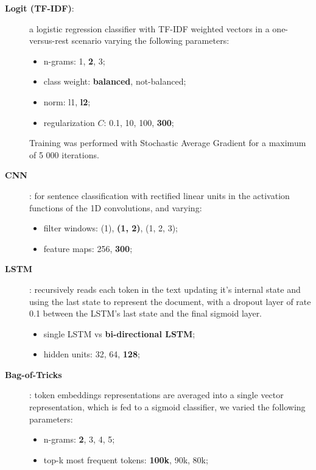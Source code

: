 \documentclass[11pt,a4paper]{article}
\begin{document}
\begin{description}

\item[\textbf{Logit (TF-IDF)}:] a logistic regression classifier with TF-IDF
weighted vectors in a one-versus-rest scenario varying the following parameters:

\begin{itemize}
\item n-grams: 1, \textbf{2}, 3;
\item class weight: \textbf{balanced}, not-balanced;
\item norm: l1, \textbf{l2};
\item regularization $C$: 0.1, 10, 100, \textbf{300};
\end{itemize}

Training was performed with Stochastic Average Gradient for a maximum of 5 000
iterations.

\item[\textbf{CNN}]\cite{kim-2014-convolutional}: for sentence classification
with rectified linear units in the activation functions of the 1D convolutions,
and varying:

\begin{itemize}
\item filter windows: (1), \textbf{(1, 2)}, (1, 2, 3);
\item feature maps: 256, \textbf{300};
\end{itemize}

\item[\textbf{LSTM}]\cite{Hochreiter:1997:LSM:1246443.1246450}: recursively reads
each token in the text updating it's internal state and using the last state to
represent the document, with a dropout layer of rate 0.1 between the LSTM's last
state and the final sigmoid layer.

\begin{itemize}
\item single LSTM vs \textbf{bi-directional LSTM};
\item hidden units: 32, 64, \textbf{128};
\end{itemize}

\item[\textbf{Bag-of-Tricks}]\cite{joulin-etal-2017-bag}: token embeddings
representations are averaged into a single vector representation, which is fed
to a sigmoid classifier, we varied the following parameters:

\begin{itemize}
\item n-grams: \textbf{2}, 3, 4, 5;
\item top-k most frequent tokens: \textbf{100k}, 90k, 80k;
\end{itemize}

\end{description}
\end{document}
